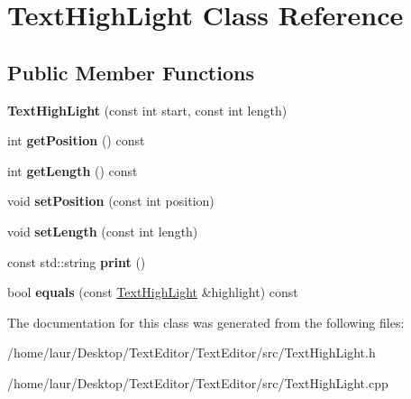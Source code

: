 \hypertarget{class_text_high_light}{}\section{Text\+High\+Light Class Reference}
\label{class_text_high_light}
\subsection*{Public Member Functions}
\begin{DoxyCompactItemize}
\item 
\mbox{\label{class_text_high_light_aa0846a7564121cc66bf0bc13aa054640}} 
{\bfseries Text\+High\+Light} (const int start, const int length)
\item 
\mbox{\label{class_text_high_light_a16c3c269cab5723c395c32415cfd00de}} 
int {\bfseries get\+Position} () const
\item 
\mbox{\label{class_text_high_light_a6259545933a8d793e39471183ef5987c}} 
int {\bfseries get\+Length} () const
\item 
\mbox{\label{class_text_high_light_a86a623ae72f2a72e26e90c052b5f624b}} 
void {\bfseries set\+Position} (const int position)
\item 
\mbox{\label{class_text_high_light_ac5705571bb13c119366445720f0ac854}} 
void {\bfseries set\+Length} (const int length)
\item 
\mbox{\label{class_text_high_light_a90dd84bff5d502745a7541bd52dc9b36}} 
const std\+::string {\bfseries print} ()
\item 
\mbox{\label{class_text_high_light_a5601764db019d24c9b07d16760534ae8}} 
bool {\bfseries equals} (const \hyperlink{class_text_high_light}{Text\+High\+Light} \&highlight) const
\end{DoxyCompactItemize}


The documentation for this class was generated from the following files\+:\begin{DoxyCompactItemize}
\item 
/home/laur/\+Desktop/\+Text\+Editor/\+Text\+Editor/src/Text\+High\+Light.\+h\item 
/home/laur/\+Desktop/\+Text\+Editor/\+Text\+Editor/src/Text\+High\+Light.\+cpp\end{DoxyCompactItemize}
